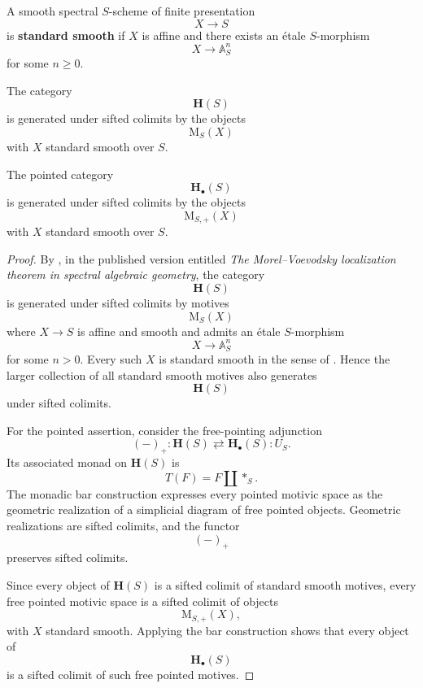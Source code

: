 \begin{definition}
\label{def:standard-smooth-spectral-scheme}
A smooth spectral \(S\)-scheme of finite presentation
\[
    X
    \longrightarrow
    S
\]
is \textbf{standard smooth} if \(X\) is affine and there exists an
étale \(S\)-morphism
\[
    X
    \longrightarrow
    \mathbb A^n_S
\]
for some \(n\geq0\).
\end{definition}

\begin{proposition}
\label{prop:generation-by-standard-smooth-motives}
The category
\[
    \mathbf H(S)
\]
is generated under sifted colimits by the objects
\[
    \mathrm M_S(X)
\]
with \(X\) standard smooth over \(S\).

The pointed category
\[
    \mathbf H_\bullet(S)
\]
is generated under sifted colimits by the objects
\[
    \mathrm M_{S,+}(X)
\]
with \(X\) standard smooth over \(S\).
\end{proposition}

\begin{proof}
By
\cite[Proposition~2.4.4]{KhanBraveNewMotivicI}, in the published version
entitled \emph{The Morel--Voevodsky localization theorem in spectral
algebraic geometry}, the category
\[
    \mathbf H(S)
\]
is generated under sifted colimits by motives
\[
    \mathrm M_S(X)
\]
where \(X\to S\) is affine and smooth and admits an étale
\(S\)-morphism
\[
    X
    \longrightarrow
    \mathbb A_S^n
\]
for some \(n>0\).  Every such \(X\) is standard smooth in the sense of
.  Hence the larger collection
of all standard smooth motives also generates
\[
    \mathbf H(S)
\]
under sifted colimits.

For the pointed assertion, consider the free-pointing adjunction
\[
    (-)_+
    \colon
    \mathbf H(S)
    \rightleftarrows
    \mathbf H_\bullet(S)
    :
    U_S.
\]
Its associated monad on \(\mathbf H(S)\) is
\[
    T(F)
    =
    F\amalg *_S.
\]
The monadic bar construction expresses every pointed motivic space as
the geometric realization of a simplicial diagram of free pointed
objects.  Geometric realizations are sifted colimits, and the functor
\[
    (-)_+
\]
preserves sifted colimits.

Since every object of \(\mathbf H(S)\) is a sifted colimit of standard
smooth motives, every free pointed motivic space is a sifted colimit of
objects
\[
    \mathrm M_{S,+}(X),
\]
with \(X\) standard smooth.  Applying the bar construction shows that
every object of
\[
    \mathbf H_\bullet(S)
\]
is a sifted colimit of such free pointed motives.
\end{proof}

